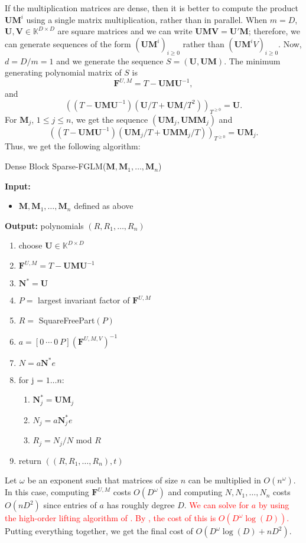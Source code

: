 \documentclass[12pt]{article}
\newcommand{\todo}[1]{\textcolor{red}{#1}}
\def\mF{\mathbf{F}}
\def\mM{\mathbf{M}}
\def\mN{\mathbf{N}}
\def\mU{\mathbf{U}}
\def\mV{\mathbf{V}}
\begin{document}
If the multiplication matrices are dense, then it is
better to compute the product $\mU \mM^i$ using a single matrix multiplication,
rather than in parallel.
When $m = D$, $\mU,\mV \in \mathbb{K}^{D \times D}$ are square matrices
and we can write $\mU\mM\mV = \mU'\mM$; therefore, we can generate sequences of the
form $(\mU\mM^i)_{i\ge0}$ rather than $(\mU\mM^iV)_{i\ge0}$. Now, $d = D/m = 1$
and we generate the sequence $ S = (\mU, \mU\mM)$. The minimum generating polynomial
matrix of $S$ is 
$$\mF^{U,M} = T - \mU\mM\mU^{-1},$$ 
and 
$$((T - \mU\mM\mU^{-1})(\mU/T + \mU\mM/T^2))_{T^{\ge 0}} = \mU. $$
For $\mM_j$, $1 \le j \le n$, we get the sequence $(\mU\mM_j,\mU\mM\mM_j)$ and
$$((T - \mU\mM\mU^{-1})(\mU\mM_j/T + \mU\mM\mM_j/T))_{T^{\ge 0}} = \mU\mM_j.$$
Thus, we get the following algorithm:

\begin{algorithm}[H]
	\caption{Dense Block Sparse-FGLM($\mM,\mM_1,\dots,\mM_n$)}
	{\bf Input:} \vspace{-0.5em}
	\begin{itemize}
		\item $\mM,\mM_1,\dots,\mM_n$ defined as above
	\end{itemize}
	{\bf Output:} polynomials $(R,R_1,\dots,R_n)$
  \begin{enumerate}[{\bf 1.}]
		\item choose $\mU \in \mathbb{K}^{D\times D}$
		\item $\mF^{U,M} = T - \mU\mM\mU^{-1}$
		\item $\mN^{*} = \mU$
		\item $P =$ largest invariant factor of $\mF^{U,M}$
		\item $R =$ SquareFreePart$(P)$
		\item {\sf $a = [0 ~\cdots~ 0~ P] (\mF^{U,M,V})^{-1}$}
		\item {\sf $N=a\mN^*e$}
		\item {for j = $1 \dots n$:}
      \begin{enumerate}[{\bf 8.1.}]
			\item $\mN_j^* = \mU\mM_j$
			\item $N_j = a\mN_j^*e$
			\item $R_j = N_j/N$ mod $R$
		\end{enumerate}
		\item return $((R, R_1,\dots,R_n),t)$
	\end{enumerate}
	\label{algo:dense-block-sparse-fglm}
\end{algorithm}
Let $\omega$ be an exponent such that matrices of size $n$ can be multiplied
in $O(n^{\omega})$. In this case, computing $\mF^{U,M}$ costs $O(D^\omega)$
and computing $N,N_1,\dots,N_n$ costs $O(nD^2)$ since entries of $a$ has roughly degree $D$. \todo{We can solve for $a$ by
using the high-order lifting algorithm of \cite[Algorithm~5]{Stor03}. 
By \cite[Corollary~16]{Stor03}, the cost of this is $O(D^\omega \log(D))$.}
Putting everything together, we get the final cost of $O(D^\omega\log(D) + nD^2)$.
\end{document}
